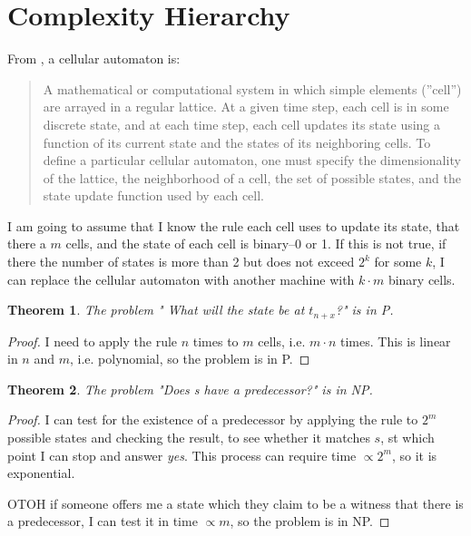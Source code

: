 \documentclass[]{article}
\newtheorem{thm}{Theorem}
\begin{document}
\section{Complexity Hierarchy}

From \cite{sfi2020glossary}, a cellular automaton is: \begin{quotation}
	A mathematical or computational system in which simple elements (''cell'') are arrayed in a regular lattice. At a given time step, each cell is in some discrete state, and at each time step, each cell updates its state using a function of its current state and the states of its neighboring cells. To define a particular cellular automaton, one must specify the dimensionality of the lattice, the neighborhood of a cell, the set of possible states, and the state update function used by each cell. 
\end{quotation}
I am going to assume that I know the rule each cell uses to update its state, that there a $m$ cells, and the state of each cell is binary--0 or 1. If this is not true, if there the number of states is more than 2 but does not exceed $2^k$ for some $k$, I can replace the cellular automaton with another machine with $k\cdot m$ binary cells. 

\begin{thm}
	The problem " What will the state be at $t_{n+x}$?" is in P.
\end{thm}

\begin{proof}
	I need to apply the rule $n$ times to $m$ cells, i.e. $m \cdot n$ times. 
	This is linear in $n$ and $m$, i.e. polynomial, so the problem is in P. 
\end{proof}


\begin{thm}
	The problem "Does s have a predecessor?" is in NP.
\end{thm}

\begin{proof}
	I can test for the existence of a predecessor by applying the rule to $2^m$ possible states and checking the result, to see whether it matches $s$, st which point I can stop and answer \emph{yes}. This process can require time $\propto 2^m$, so it is exponential.

	OTOH if someone offers me a state which they claim to be a witness that there is a predecessor,  I can test it in time $\propto m$, so the problem is in NP. 

\end{proof}
\end{document}
